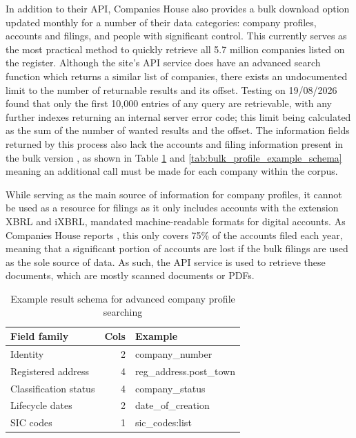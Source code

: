 \documentclass[ %
                    author={Natchalin Iwsakul \\[0.4em] Inkaphol Siriwongwattana \\[0.4em] Tanaphan Kummaraphat \\[0.6em] Patorn Srisupap},,
                supervisor={Fernando Moreno-Pino},
                    degree={MSc},
                     title={Propensity Modelling for SME Commercial Lending Using Open Public Data
},
                  subtitle={Companies House and GDELT as predictors of first-time borrowing},
                      type={},
                      year={2026}]{dissertation}
\begin{document}
In addition to their API, Companies House also provides a bulk download option updated monthly for a number of their data categories: company profiles, accounts and filings, and people with significant control. This currently serves as the most practical method to quickly retrieve all 5.7 million companies listed on the register. Although the site's API service does have an advanced search function which returns a similar list of companies, there exists an undocumented limit to the number of returnable results and its offset. Testing on 19/08/2026 found that only the first 10,000 entries of any query are retrievable, with any further indexes returning an internal server error code; this limit being calculated as the sum of the number of wanted results and the offset. The information fields returned by this process also lack the accounts and filing information present in the bulk version \cite{CH_advanced_company_search_example}, as shown in Table \ref{tab:advanced_search_example_schema} and \ref{tab:bulk_profile_example_schema} meaning an additional call must be made for each company within the corpus.

While serving as the main source of information for company profiles, it cannot be used as a resource for filings as it only includes accounts with the extension XBRL and iXBRL, mandated machine-readable formats for digital accounts. As Companies House reports \cite{CH_bulk_filings}, this only covers 75\% of the accounts filed each year, meaning that a significant portion of accounts are lost if the bulk filings are used as the sole source of data. As such, the API service is used to retrieve these documents, which are mostly scanned documents or PDFs.

\begin{table}[h]
    \centering

    \begin{tabular}{lrl}
        \toprule
        Field family & Cols	& Example \\
        \midrule
        Identity & 2 & company\_number \\
        Registered address & 4 & reg\_address.post\_town \\
        Classification status & 4 & company\_status \\
        Lifecycle dates & 2 & date\_of\_creation \\
        SIC codes & 1 & sic\_codes:list \\
        \bottomrule
    \end{tabular}
    \caption{Example result schema for advanced company profile searching}
    \label{tab:advanced_search_example_schema}
\end{table}
\end{document}
